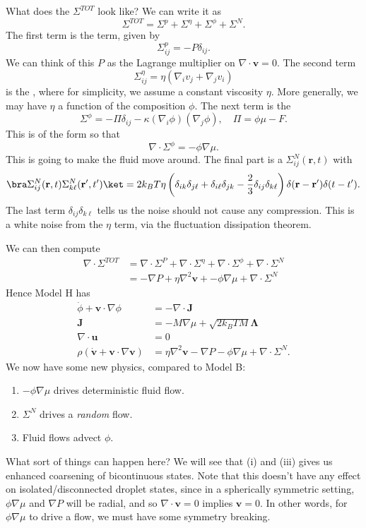 \documentclass[a4paper]{article}
\begin{document}
What does the $\Sigma^{TOT}$ look like? We can write it as
\[
  \Sigma^{TOT} = \Sigma^p + \Sigma^\eta + \Sigma^\phi + \Sigma^N.
\]
The first term is the  term, given by
\[
  \Sigma_{ij}^p = - P \delta_{ij}.
\]
We can think of this $P$ as the Lagrange multiplier on $\nabla \cdot \mathbf{v} = 0$. The second term
\[
  \Sigma_{ij}^\eta = \eta (\nabla_i v_j + \nabla_j v_i)
\]
is the , where for simplicity, we assume a constant viscosity $\eta$. More generally, we may have $\eta$ a function of the composition $\phi$. The next term is the 
\[
  \Sigma^\phi = - \Pi \delta_{ij} - \kappa (\nabla_i \phi) (\nabla_j \phi),\quad \Pi = \phi \mu - F.
\]
This is of the form so that
\[
  \nabla \cdot \Sigma^\phi = - \phi \nabla \mu.
\]
This is going to make the fluid move around. The final part is a  $\Sigma_{ij}^N (\mathbf{r}, t)$ with
\[
  \bra \Sigma_{ij}^N (\mathbf{r}, t) \Sigma_{k\ell}^N (\mathbf{r}', t')\ket = 2k_B T \eta \left(\delta_{ik} \delta_{j\ell} + \delta_{i\ell} \delta_{jk} - \frac{2}{3} \delta_{ij} \delta_{k\ell}\right) \delta(\mathbf{r} - \mathbf{r}') \delta(t - t').
\]
The last term $\delta_{ij} \delta_{k\ell}$ tells us the noise should not cause any compression. This is a white noise from the $\eta$ term, via the fluctuation dissipation theorem.

We can then compute
\begin{align*}
  \nabla \cdot \Sigma^{TOT} &= \nabla \cdot \Sigma^P + \nabla \cdot \Sigma^\eta + \nabla \cdot \Sigma^\phi + \nabla \cdot \Sigma^N\\
  &= - \nabla P + \eta \nabla^2 \mathbf{v} + - \phi \nabla \mu + \nabla \cdot \Sigma^N
\end{align*}
Hence Model H has
\begin{align*}
  \dot{\phi} + \mathbf{v} \cdot \nabla \phi &=- \nabla \cdot \mathbf{J}\\
  \mathbf{J} &= -M \nabla \mu + \sqrt{2k_B T M} \boldsymbol\Lambda\\
  \nabla \cdot \mathbf{u} &= 0\\
  \rho (\dot{\mathbf{v}} + \mathbf{v} \cdot \nabla \mathbf{v}) &= \eta \nabla^2 \mathbf{v} - \nabla P - \phi \nabla \mu + \nabla \cdot \Sigma^N.
\end{align*}
We now have some new physics, compared to Model B:
\begin{enumerate}
  \item $-\phi\nabla \mu$ drives deterministic fluid flow.
  \item $\Sigma^N$ drives a \emph{random} flow.
  \item Fluid flows advect $\phi$.
\end{enumerate}
What sort of things can happen here? We will see that (i) and (iii) gives us enhanced coarsening of bicontinuous states. Note that this doesn't have any effect on isolated/disconnected droplet states, since in a spherically symmetric setting, $\phi \nabla \mu$ and $\nabla P$ will be radial, and so $\nabla \cdot \mathbf{v} = 0$ implies $\mathbf{v} = 0$. In other words, for $\phi \nabla \mu$ to drive a flow, we must have some symmetry breaking.
\end{document}
